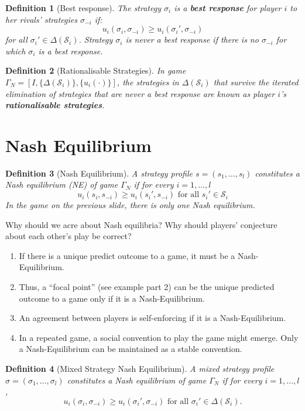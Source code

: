 \documentclass[12pt]{extreport} %
\theoremstyle{named}
\theoremstyle{itshape}
\newtheorem*{definition}{Definition}
\theoremstyle{normal}
\begin{document}
\begin{definition}[Best response]
	The strategy $\sigma_i$ is a \textbf{best response} for player $i$ to her rivals' strategies $\sigma_{-i}$ if:
	$$ u_i(\sigma_i, \sigma_{-i}) \geq u_i(\sigma_i', \sigma_{-i}) $$
	for all $\sigma_i' \in \Delta(\mathcal{S}_i)$. Strategy $\sigma_i$ is never a best response if there is no $\sigma_{-i}$ for which $\sigma_{i}$ is a best response.
\end{definition}

\begin{definition}[Rationalisable Strategies]
	In game $\Gamma_N = [I, \{ \Delta(\mathcal{S}_i) \}, \{ u_i(\cdot) \}]$, the strategies in $\Delta(\mathcal{S}_i)$ that survive the iterated elimination of strategies that are never a best response are known as player $i$'s \textbf{rationalisable strategies}.
\end{definition}

\section{Nash Equilibrium}

\begin{definition}[Nash Equilibrium]
	A strategy profile $s = (s_1, \dotsc, s_l)$ constitutes a Nash equilibrium (NE) of game $\Gamma_N$ if for every $i = 1, \dotsc, l$
	$$ u_i(s_i, s_{-i}) \geq u_i(s_i', s_{-i}) \text{ for all } s_i' \in \mathcal{S}_i $$
	In the game on the previous slide, there is only one Nash equilibrium.
\end{definition}

Why should we acre about Nash equilibria? Why should players' conjecture about each other's play be correct?
\begin{enumerate}
	\item If there is a unique predict outcome to a game, it must be a Nash-Equilibrium.
	\item Thus, a \enquote{focal point} (see example part 2) can be the unique predicted outcome to a game only if it is a Nash-Equilibrium.
	\item An agreement between players is self-enforcing if it is a Nash-Equilibrium.
	\item In a repeated game, a social convention to play the game might emerge. Only a Nash-Equilibrium can be maintained as a stable convention.
\end{enumerate} 
 
\begin{definition}[Mixed Strategy Nash Equilibrium]
	A mixed strategy profile $\sigma = (\sigma_1, \dotsc, \sigma_l)$ constitutes a Nash equilibrium of game $\Gamma_N$ if for every $i=1, \dotsc, l$,
	$$ u_i(\sigma_i, \sigma_{-i}) \geq u_i(\sigma_i', \sigma_{-i}) \text{ for all } \sigma_i' \in \Delta(\mathcal{S}_i). $$
\end{definition} 
 
\end{document}
